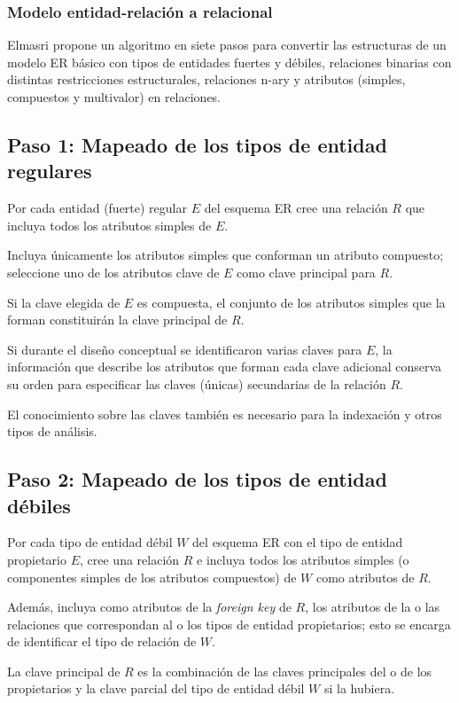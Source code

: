 \subsubsection{Modelo entidad-relación a relacional}
Elmasri\cite{ramez_elmasri_fundamentos_nodate} propone un algoritmo en siete pasos para convertir las estructuras de un modelo ER básico con tipos de entidades fuertes y débiles, relaciones binarias con distintas restricciones estructurales, relaciones n-ary y atributos (simples, compuestos y multivalor) en relaciones.

\subsection*{Paso 1: Mapeado de los tipos de entidad regulares}
Por cada entidad (fuerte) regular $E$ del esquema ER cree una relación $R$ que incluya todos los atributos simples de $E$.


Incluya únicamente los atributos simples que conforman un atributo compuesto; seleccione uno de los atributos clave de $E$ como clave principal para $R$. 


Si la clave elegida de $E$ es compuesta, el conjunto de los atributos simples que la forman constituirán la clave principal de $R$.


Si durante el diseño conceptual se identificaron varias claves para $E$, la información que describe los atributos que forman cada clave adicional conserva su orden para especificar las claves (únicas) secundarias de la relación $R$. 


El conocimiento sobre las claves también es necesario para la indexación y otros tipos de análisis.


\subsection*{Paso 2: Mapeado de los tipos de entidad débiles}
Por cada tipo de entidad débil $W$ del esquema ER con el tipo de entidad propietario $E$, cree una relación $R$ e incluya todos los atributos simples (o componentes simples de los atributos compuestos) de $W$ como atributos de $R$. 


Además, incluya como atributos de la \textit{foreign key} de $R$, los atributos de la o las relaciones que correspondan al o los tipos de entidad propietarios; esto se encarga de identificar el tipo de relación de $W$. 


La clave principal de $R$ es la combinación de las claves principales del o de los propietarios y la clave parcial del tipo de entidad débil $W$ si la hubiera.


